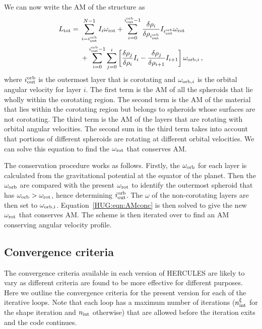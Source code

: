 \documentclass[11pt, oneside]{article}   	%
\begin{document}
We can now write the AM of the structure as
%
\begin{align}
\begin{aligned}
\label{HUG:eqn:AMconc}
L_{\rm tot} = {} &  \sum_{i=i_{\rm out}^{\rm orb}}^{N-1} I_i  \omega_{\rm rot} + \sum_{i=0}^{i_{\rm out}^{\rm orb}-1}  \frac{\delta\rho_i}{\delta\rho_{i_{\rm out}^{\rm orb}}} I_{i_{\rm out}^{\rm orb}}  \omega_{\rm rot}  \\
& + \sum_{i=0}^{i_{\rm out}^{\rm orb}-1} \sum_{j=0}^{i}  \left [ \frac{\delta\rho_j}{\delta\rho_{i}} I_{i} - \frac{\delta\rho_j}{\delta\rho_{i+1}} I_{i+1} \right ] \omega_{{\rm orb},i} \,,
\end{aligned}
\end{align}
%
where $i_{\rm out}^{\rm orb}$ is the outermost layer that is corotating and $\omega_{{\rm orb},i}$ is the orbital angular velocity for layer $i$. 
The first term is the AM of all the spheroids that lie wholly within the corotating region.
The second term is the AM of the material that lies within the corotating region but belongs to spheroids whose surfaces are not corotating.
The third term is the AM of the layers that are rotating with orbital angular velocities. 
The second sum in the third term takes into account that portions of different spheroids are rotating at different orbital velocities.
We can solve this equation to find the $\omega_{\rm rot}$ that conserves AM. 

The conservation procedure works as follows.
Firstly, the $\omega_{\rm orb}$ for each layer is calculated from the gravitational potential at the equator of the planet.
Then the $\omega_{\rm orb}$ are compared with the present $\omega_{\rm rot}$ to identify the outermost spheroid that has $\omega_{\rm orb}>\omega_{\rm rot}$, hence determining $i_{\rm out}^{\rm orb}$.
The $\omega$ of the non-corotating layers are then set to $\omega_{\rm orb, i}$.
Equation~\ref{HUG:eqn:AMconc} is then solved to give the new $\omega_{\rm rot}$ that conserves AM.
The scheme is then iterated over to find an AM conserving angular velocity profile.

\subsection{Convergence criteria}
\label{HUG:sec:convergence}

The convergence criteria available in each version of HERCULES are likely to vary as different criteria are found to be more effective for different purposes.
Here we outline the convergence criteria for the present version for each of the iterative loops.
Note that each loop has a maximum number of iterations ($n_{\rm int}^{\xi}$ for the shape iteration and $n_{\rm int}$ otherwise) that are allowed before the iteration exits and the code continues.
\end{document}
